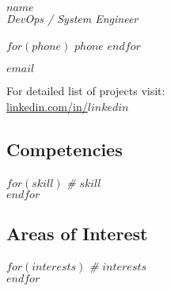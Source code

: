 \documentclass[$fontsize$, a4paper]{article}
\begin{document}
{\LARGE $name$}\\[.2cm]
{\large \textsl{DevOps / System Engineer}}\\[.1cm]


\begin{multicols}{2}

$for(phone)$
$phone$
$endfor$

\href{mailto:$email$}{$email$}\\

\columnbreak

For detailed list of projects visit:\\
\href{http://linkedin.com/in/$linkedin$}{linkedin.com/in/$linkedin$}


\end{multicols}






\begin{multicols}{2}

\subsection*{Competencies}
$for(skill)$
\emph{\#} \enspace $skill$\\
$endfor$

\columnbreak

\subsection*{Areas of Interest}
$for(interests)$
\emph{\#} \enspace $interests$\\
$endfor$

\end{multicols}


\end{document}
